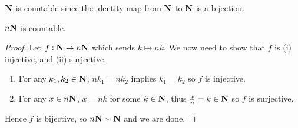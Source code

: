 \begin{comment}
Since $x\in S$ if and only if $\chi_S(x)=1$, it follows that
\[ |S|=\sum_{x\in U}\chi_S(x). \]
To prove the PIE, we calculate
\begin{align*}
&|S_1\cup\cdots\cup S_n|\\
&=\sum_{x\in U}\chi_{S_1\cup\cdots\cup S_n}(x)\\
&=\sum_{x\in U}1-\brac{1-\chi_{S_1}(x)}\cdots\brac{1-\chi_{S_n}(x)}\\
&=\brac{\chi_{S_1}(x)+\cdots+\chi_{S_n}(x)}-\brac{\chi_{S_1}(x)\chi_{S_2}(x)+\cdots+\chi_{S_{n-1}}(x)\chi_{S_n}(x)}+\cdots+(-1)^{n+1}\chi_{S_1}(x)\cdots\chi_{S_n}(x)\\
&=\brac{\chi_{S_1}(x)+\cdots+\chi_{S_n}(x)}-\brac{\chi_{S_1\cap S_2}(x)+\cdots+\chi_{S_{n-1}\cap S_n}(x)}+\cdots+(-1)^{n+1}\chi_{S_1\cap\cdots\cap S_n}(x)\\
&=\sum_{i=1}^n|S_i|-\sum_{J\subset\{1,\dots,n\},|J|=2}\absolute{\bigcap_{j\in J}S_j}+\cdots+(-1)^{k+1}\sum_{J\subset\{1,\dots,n\},|J|=k}\absolute{\bigcap_{j\in J}S_j}+\cdots+(-1)^{n+1}\absolute{\bigcap_{i=1}^nS_i}.
\end{align*}
\end{proof}

\subsection{Countability}
For two finite sets $A$ and $B$, we evidently have $A\sim B$ if and only if $A$ and $B$ contain the same number of elements. For infinite sets, however, the idea of ``having the same number of elements'' becomes quite vague, whereas the notion of bijectivity retains its clarity.
\end{comment}

\begin{example}
$\mathbf N$ is countable since the identity map from $\mathbf N$ to $\mathbf N$ is a bijection.
\end{example}

\begin{example}
$n\mathbf N$ is countable.
\begin{proof}
Let $f:\mathbf N\to n\mathbf N$ which sends $k\mapsto nk$. We now need to show that $f$ is (i) injective, and (ii) surjective.
\begin{enumerate}[label=(\roman*)]
\item For any $k_1,k_2\in\mathbf N$, $nk_1=nk_2$ implies $k_1=k_2$ so $f$ is injective.
\item For any $x\in n\mathbf N$, $x=nk$ for some $k\in\mathbf N$, thus $\frac{x}{n}=k\in\mathbf N$ so $f$ is surjective.
\end{enumerate}
Hence $f$ is bijective, so $n\mathbf N\sim\mathbf N$ and we are done.
\end{proof}
\end{example}

